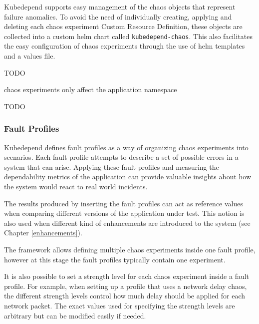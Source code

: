 Kubedepend supports easy management of the chaos objects that represent failure anomalies. To avoid the need of individually creating, applying and deleting each chaos experiment Custom Resource Definition, these objects are collected into a custom helm chart called \texttt{kubedepend-chaos}. This also facilitates the easy configuration of chaos experiments through the use of helm templates and a values file.

TODO

chaos experiments only affect the application namespace

TODO

\subsubsection{Fault Profiles} \label{test-impl-fault-profiles}


Kubedepend defines fault profiles as a way of organizing chaos experiments into scenarios. Each fault profile attempts to describe a set of possible errors in a system that can arise. Applying these fault profiles and measuring the dependability metrics of the application can provide valuable insights about how the system would react to real world incidents.

The results produced by inserting the fault profiles can act as reference values when comparing different versions of the application under test. This notion is also used when different kind of enhancements are introduced to the system (see Chapter \ref{enhancements}).

The framework allows defining multiple chaos experiments inside one fault profile, however at this stage the fault profiles typically contain one experiment. 

It is also possible to set a strength level for each chaos experiment inside a fault profile. For example, when setting up a profile that uses a network delay chaos, the different strength levels control how much delay should be applied for each network packet. The exact values used for specifying the strength levels are arbitrary but can be modified easily if needed.

